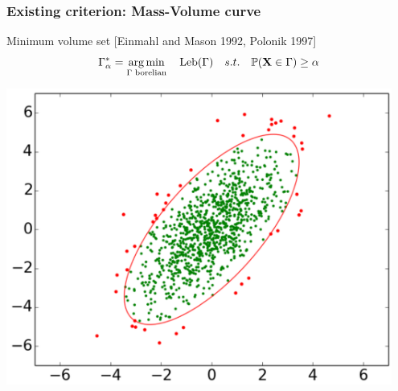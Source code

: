 \documentclass[9pt]{beamer}
\newcommand\blue{\color{blue} }
\def\argmin{\operatornamewithlimits{arg\,min}}
\def\mb{\mathbf}
\begin{document}
\begin{frame}
\frametitle{Existing criterion: Mass-Volume curve}

\begin{minipage}{0.6\textwidth}
	{\blue Minimum volume set} {\small [Einmahl and Mason 1992, Polonik 1997]}
	\begin{equation*}
	\Gamma^*_{\alpha} = \argmin_{\Gamma\text{ borelian} } ~~~\text{Leb}(\Gamma)~~~s.t.~~~ \mathbb{P}(\mb X \in \Gamma) \geq \alpha
	\end{equation*}
\end{minipage}
\begin{minipage}{0.3\textwidth}
	\centering
	\includegraphics[width=0.95\textwidth]{img/anomaly_detection_end_col.png}
\end{minipage}



\end{frame}
\end{document}

